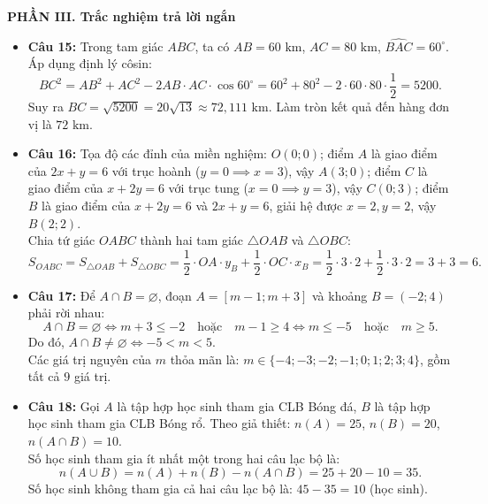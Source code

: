 \documentclass[12pt,a4paper]{article}
\begin{document}
\vspace{0.15cm}
\textbf{PHẦN III. Trắc nghiệm trả lời ngắn}
\begin{itemize}[leftmargin=0.6cm, itemsep=1.5pt, topsep=1pt]
    \item \textbf{Câu 15:} Trong tam giác $ABC$, ta có $AB = 60\text{ km}$, $AC = 80\text{ km}$, $\widehat{BAC} = 60^\circ$.
    Áp dụng định lý côsin:
    \[
    BC^2 = AB^2 + AC^2 - 2 AB \cdot AC \cdot \cos 60^\circ = 60^2 + 80^2 - 2 \cdot 60 \cdot 80 \cdot \dfrac{1}{2} = 5200.
    \]
    Suy ra $BC = \sqrt{5200} = 20\sqrt{13} \approx 72{,}111\text{ km}$. Làm tròn kết quả đến hàng đơn vị là $72\text{ km}$.
    \item \textbf{Câu 16:} Tọa độ các đỉnh của miền nghiệm:
    $O(0; 0)$; điểm $A$ là giao điểm của $2x + y = 6$ với trục hoành ($y = 0 \implies x = 3$), vậy $A(3; 0)$;
    điểm $C$ là giao điểm của $x + 2y = 6$ với trục tung ($x = 0 \implies y = 3$), vậy $C(0; 3)$;
    điểm $B$ là giao điểm của $x + 2y = 6$ và $2x + y = 6$, giải hệ được $x = 2, y = 2$, vậy $B(2; 2)$.\\
    Chia tứ giác $OABC$ thành hai tam giác $\triangle OAB$ và $\triangle OBC$:
    \[
    S_{OABC} = S_{\triangle OAB} + S_{\triangle OBC} = \dfrac{1}{2} \cdot OA \cdot y_B + \dfrac{1}{2} \cdot OC \cdot x_B = \dfrac{1}{2} \cdot 3 \cdot 2 + \dfrac{1}{2} \cdot 3 \cdot 2 = 3 + 3 = 6.
    \]
    \item \textbf{Câu 17:} Để $A \cap B = \varnothing$, đoạn $A = [m - 1; m + 3]$ và khoảng $B = (-2; 4)$ phải rời nhau:
    \[
    A \cap B = \varnothing \iff m + 3 \le -2 \quad \text{hoặc} \quad m - 1 \ge 4 \iff m \le -5 \quad \text{hoặc} \quad m \ge 5.
    \]
    Do đó, $A \cap B \ne \varnothing \iff -5 < m < 5$.\\
    Các giá trị nguyên của $m$ thỏa mãn là: $m \in \{-4; -3; -2; -1; 0; 1; 2; 3; 4\}$, gồm tất cả $9$ giá trị.
    \item \textbf{Câu 18:} Gọi $A$ là tập hợp học sinh tham gia CLB Bóng đá, $B$ là tập hợp học sinh tham gia CLB Bóng rổ.
    Theo giả thiết: $n(A) = 25$, $n(B) = 20$, $n(A \cap B) = 10$.\\
    Số học sinh tham gia ít nhất một trong hai câu lạc bộ là:
    \[
    n(A \cup B) = n(A) + n(B) - n(A \cap B) = 25 + 20 - 10 = 35.
    \]
    Số học sinh không tham gia cả hai câu lạc bộ là: $45 - 35 = 10$ (học sinh).
\end{itemize}
\end{document}
